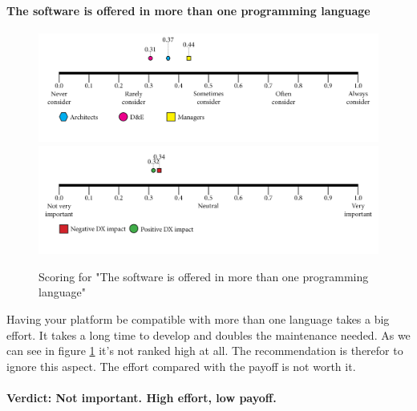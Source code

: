 \documentclass{article}
\begin{document}
\paragraph{The software is offered in more than one programming language}
\begin{figure}[H]
\centering
\includegraphics[width=\linewidth]{scorelines/aspect13.png}
\includegraphics[width=\linewidth]{dxscorelines/dxaspect13.png}
\caption{Scoring for "The software is offered in more than one programming language"}
\label{fig:aspect13}
\end{figure}
Having your platform be compatible with more than one language takes a big effort. It takes a long time to develop and doubles the maintenance needed. As we can see in figure \ref{fig:aspect13} it's not ranked high at all. The recommendation is therefor to ignore this aspect. The effort compared with the payoff is not worth it. \\ \\
\textbf{Verdict: Not important. High effort, low payoff.}
\end{document}
